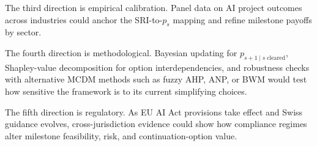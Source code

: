 \documentclass[oneside,10pt]{swissi}
\begin{document}
The third direction is empirical calibration. Panel data on AI project outcomes across industries could anchor the SRI-to-$p_s$ mapping and refine milestone payoffs by sector.

The fourth direction is methodological. Bayesian updating for $p_{s+1 \mid s\;\text{cleared}}$, Shapley-value decomposition for option interdependencies, and robustness checks with alternative MCDM methods such as fuzzy AHP, ANP, or BWM would test how sensitive the framework is to its current simplifying choices.

The fifth direction is regulatory. As EU AI Act provisions take effect and Swiss guidance evolves, cross-jurisdiction evidence could show how compliance regimes alter milestone feasibility, risk, and continuation-option value.

\nocite{*}

\bigskip

\printbibliography

\swDeclarationsPage
\end{document}
